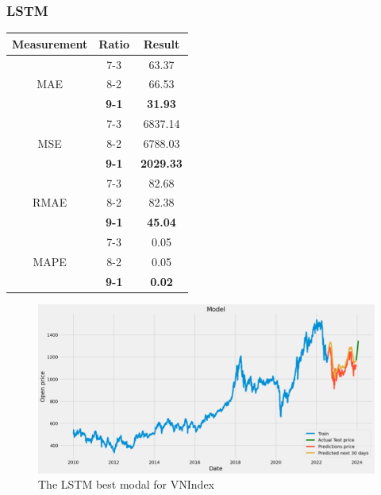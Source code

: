\documentclass{ieeeojies}
\begin{document}
\subsubsection{LSTM}
\begin{table}[H]
    \centering
    \begin{tabular}{|c|c|c|}
        \hline
         Measurement & Ratio &  Result  \\
        \hline
             & 7-3 & 63.37  \\
        MAE  & 8-2 & 66.53  \\
            & \textbf{9-1 }& \textbf{31.93}  \\
        \hline
           & 7-3 & 6837.14  \\
        MSE  & 8-2 & 6788.03  \\
            & \textbf{9-1} & \textbf{2029.33}  \\
        \hline
           & 7-3 & 82.68  \\
        RMAE  & 8-2 & 82.38  \\
            & \textbf{9-1} & \textbf{45.04 } \\
        \hline
           & 7-3 & 0.05  \\
        MAPE  & 8-2 & 0.05  \\
            & \textbf{9-1} &\textbf{ 0.02 } \\
        \hline
    \end{tabular}
    \label{table:example}
\end{table}
\begin{figure}[H]
    \centering
    \includegraphics[width=0.8\linewidth]{LM VNI 91.jpg}
    \caption{The LSTM best modal for VNIndex}
    \label{fig:example}
\end{figure}
\end{document}
